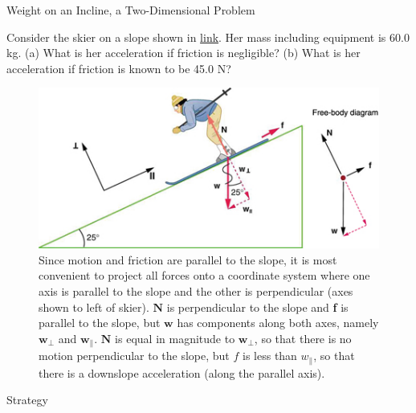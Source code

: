 \documentclass[
]{book}
\begin{document}
\hypertarget{fs-id2627411}{}
Weight on an Incline, a Two-Dimensional Problem

Consider the skier on a slope shown in
\protect\hyperlink{import-auto-id2149297}{link}. Her mass
including equipment is 60.0 kg. (a) What is her acceleration if friction
is negligible? (b) What is her acceleration if friction is known to be
45.0 N?

\begin{figure}
\hypertarget{import-auto-id2149297}{%
\centering
\includegraphics{images/Figure_04_05_02.jpg}
\caption{Since motion and friction are parallel to the slope, it is most
convenient to project all forces onto a coordinate system where one axis
is parallel to the slope and the other is perpendicular (axes shown to
left of skier). \(\textbf{N}{}\) is perpendicular to the slope and \textbf{f}
is parallel to the slope, but \(\textbf{w}{}\) has components along both
axes, namely \(\textbf{w}_{\bot}{}\) and \(\textbf{w}_{\parallel}{}\).
\(\textbf{N}{}\)\textbf{} is equal in magnitude
to \(\textbf{w}_{\bot}{}\), so that there is no motion perpendicular to
the slope, but \(f{}\) is less than \(w_{\parallel}{}\), so that there is a
downslope acceleration (along the parallel
axis).}\label{import-auto-id2149297}
}
\end{figure}

{Strategy}
\end{document}
